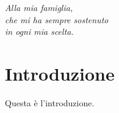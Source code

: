\documentclass[12pt,a4paper,openright,twoside]{report}
\begin{document}
\begin{titlepage}                       %
%
\thispagestyle{empty}                   %
\topmargin=6.5cm                        %
\raggedleft                             %
\large                                  %
\em                                     %
Alla mia famiglia, \\
che mi ha sempre sostenuto \\
in ogni mia scelta.                      %
\newpage                                %
%
\clearpage{\pagestyle{empty}\cleardoublepage}%
\end{titlepage}
\chapter*{Introduzione}                 %
Questa \`e l'introduzione.
\clearpage{\pagestyle{empty}\cleardoublepage}
\tableofcontents                        %
\rhead[\fancyplain{}{\bfseries\leftmark}]{\fancyplain{}{\bfseries\thepage}}
\clearpage{\pagestyle{empty}\cleardoublepage}
\listoffigures                          %
\clearpage{\pagestyle{empty}\cleardoublepage}
\listoftables                           %
\clearpage{\pagestyle{empty}\cleardoublepage}
\end{document}
